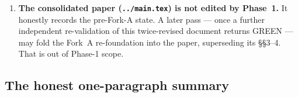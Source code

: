 \documentclass[11pt,oneside]{amsart}
\theoremstyle{plain}
\theoremstyle{definition}
\theoremstyle{remark}
\theoremstyle{honeststyle}
\begin{document}
\begin{enumerate}[leftmargin=1.9em]
  a further independent re-validation of this twice-revised document
  returning GREEN. Of the Fork~A content,
  Theorems~\ref{thm:projection},~\ref{thm:welldefined}, and~%
  \ref{thm:maschke} and Proposition~\ref{prop:y2a-mech} are the
  formalization-ready core; the residuals R1 (three-part), R2, and R3
  (three-part) are not.
\item \textbf{The consolidated paper (\texttt{../main.tex}) is not
  edited by Phase~1.} It honestly records the pre-Fork-A state. A
  later pass --- once a further independent re-validation of this
  twice-revised document returns GREEN --- may fold the Fork~A
  re-foundation into the paper, superseding its \S\S3--4. That is out
  of Phase-1 scope.
\end{enumerate}

\subsection{The honest one-paragraph summary}
\label{ssec:final}
\end{document}
